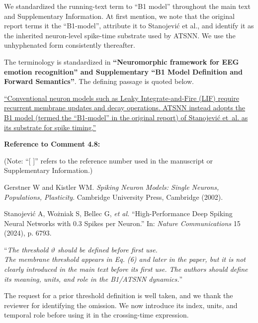 \documentclass[12pt,technote,onecolumn]{IEEEtran}
\begin{document}
We standardized the running-text term to ``B1 model'' throughout the
main text and Supplementary Information. At first mention, we note that
the original report terms it the ``B1-model'', attribute it to
Stanojevi\'c et al., and identify it as the inherited neuron-level
spike-time substrate used by ATSNN. We use the unhyphenated form
consistently thereafter.



The terminology is standardized in \textbf{``Neuromorphic framework for EEG emotion recognition'' and Supplementary ``B1 Model Definition and Forward Semantics''}. The defining passage is quoted below.

\uline{``Conventional neuron models such as Leaky Integrate-and-Fire (LIF) \cite{ref79} require recurrent membrane updates and decay operations. ATSNN instead adopts the B1 model (termed the ``B1-model'' in the original report) of Stanojevi\'{c} et~al. \cite{ref46} as its substrate for spike timing.''}

\noindent \textbf{Reference to Comment 4.8:}

\noindent(Note: ``[ ]'' refers to the reference number used in the manuscript or Supplementary Information.)

\noindent[41]\:Gerstner W and Kistler WM. \textit{Spiking Neuron Models: Single Neurons, Populations, Plasticity}. Cambridge University Press, Cambridge (2002).

\noindent[42]\:Stanojevi\'{c} A, Wo\.{z}niak S, Bellec G, \textit{et al.} ``High-Performance Deep Spiking Neural Networks with 0.3 Spikes per Neuron.'' In: \textit{Nature Communications} 15 (2024), p. 6793.

\vspace{4mm}

``{\it The threshold \(\vartheta\) should be defined before first use.\\
The membrane threshold appears in Eq. (6) and later in the paper, but it
is not clearly introduced in the main text before its first use. The
authors should define its meaning, units, and role in the B1/ATSNN
dynamics.}''
\vspace{1mm}


The request for a prior threshold definition is well taken, and we thank the reviewer for identifying the omission. We now introduce its index, units, and temporal role before using it in the crossing-time expression.
\end{document}
